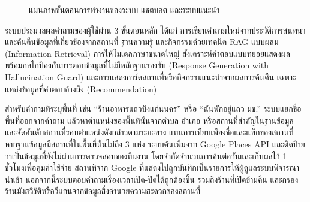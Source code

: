 \begin{enumerate}
\begin{figure}[H]
{%
}
\caption{แผนภาพขั้นตอนการทำงานของระบบ แชตบอต และระบบแนะนำ}
\end{figure}

ระบบประมวลผลคำถามของผู้ใช้ผ่าน 3 ขั้นตอนหลัก ได้แก่ การเขียนคำถามใหม่จากประวัติการสนทนาและค้นคืนข้อมูลที่เกี่ยวข้องจากสถานที่ ฐานความรู้ และกิจกรรมด้วยเทคนิค RAG แบบผสม (Information Retrieval) การให้โมเดลภาษาขนาดใหญ่ สังเคราะห์คำตอบแบบทยอยแสดงผลพร้อมกลไกป้องกันการตอบข้อมูลที่ไม่มีหลักฐานรองรับ (Response Generation with Hallucination Guard) และการแสดงการ์ดสถานที่หรือกิจกรรมแนะนำจากผลการค้นคืน เฉพาะแหล่งข้อมูลที่คำตอบอ้างถึง (Recommendation)

สำหรับคำถามที่ระบุพื้นที่ เช่น ``ร้านอาหารแถวบึงแก่นนคร'' หรือ ``ฉันพักอยู่แถว มข.'' ระบบแยกชื่อพื้นที่ออกจากคำถาม แล้วหาตำแหน่งของพื้นที่นั้นจากตำบล อำเภอ หรือสถานที่สำคัญในฐานข้อมูล และจัดอันดับสถานที่รอบตำแหน่งดังกล่าวตามระยะทาง แทนการเทียบเพียงชื่อและแท็กของสถานที่ หากฐานข้อมูลมีสถานที่ในพื้นที่นั้นไม่ถึง 3 แห่ง ระบบค้นเพิ่มจาก Google Places API และติดป้ายว่าเป็นข้อมูลที่ยังไม่ผ่านการตรวจสอบของทีมงาน โดยจำกัดจำนวนการค้นต่อวันและเก็บผลไว้ 1 ชั่วโมงเพื่อคุมค่าใช้จ่าย สถานที่จาก Google ที่แสดงไปถูกบันทึกเป็นรายการให้ผู้ดูแลระบบพิจารณานำเข้า นอกจากนี้ระบบตอบคำถามเรื่องเวลาเปิด-ปิดได้ถูกต้องขึ้น รวมถึงร้านที่เปิดข้ามคืน และกรองร้านมังสวิรัติหรือวีแกนจากข้อมูลสิ่งอำนวยความสะดวกของสถานที่


\end{enumerate}
